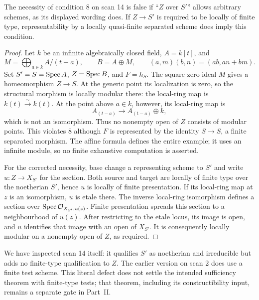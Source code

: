 \begin{proposition}\label{A:8-literal}
The necessity of condition 8 on scan 14 is false if ``$Z$ over $S'$''
allows arbitrary schemes, as its displayed wording does. If $Z\to S'$
is required to be locally of finite type, representability by a locally
quasi-finite separated scheme does imply this condition.
\end{proposition}
\begin{proof}
Let $k$ be an infinite algebraically closed field, $A=k[t]$, and
\[
 M=\bigoplus_{a\in k} A/(t-a),\qquad B=A\oplus M,
 \qquad (a,m)(b,n)=(ab,an+bm).
\]
Set $S'=S=\operatorname{Spec} A$, $Z=\operatorname{Spec} B$, and $F=h_S$. The square-zero ideal
$M$ gives a homeomorphism $Z\to S$. At the generic point its
localization is zero, so the structural morphism is locally modular
there: the local-ring map is $k(t)\xrightarrow{\sim}k(t)$.
At the point above $a\in k$, however, its local-ring map is
\[
 A_{(t-a)}\longrightarrow A_{(t-a)}\oplus k,
\]
which is not an isomorphism. Thus no nonempty open of $Z$ consists of
modular points. This violates 8 although $F$ is represented by the
identity $S\to S$, a finite separated morphism. The affine formula
defines the entire example; it uses an infinite module, so no finite
exhaustive computation is asserted.

For the corrected necessity, base change a representing scheme to
$S'$ and write $u:Z\to X_{S'}$ for the section. Both source and target
are locally of finite type over the noetherian $S'$, hence $u$ is locally
of finite presentation. If its local-ring map at $z$ is an isomorphism,
$u$ is etale there. The inverse local-ring isomorphism defines a
section over $\operatorname{Spec}\mathcal O_{X_{S'},u(z)}$. Finite presentation spreads this
section to a neighbourhood of $u(z)$. After restricting to the etale
locus, its image is open, and $u$ identifies that image with an open
of $X_{S'}$. It is consequently locally modular on a nonempty open
of $Z$, as required.
\end{proof}

We have inspected scan 14 itself: it qualifies $S'$ as noetherian and
irreducible but adds no finite-type qualification to $Z$. The earlier
version on scan 2 does use a finite test scheme. This literal defect
does not settle the intended sufficiency theorem with finite-type tests;
that theorem, including its constructibility input, remains a separate
gate in Part~II.

